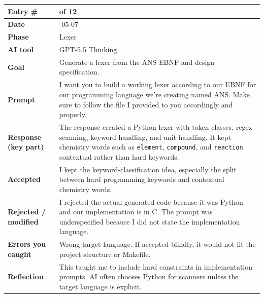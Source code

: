 \documentclass[11pt,a4paper]{article}
\newcommand{\code}[1]{\texttt{#1}}
\newcommand{\entrygap}{\vspace{8pt}}
\newenvironment{journalentry}{%
  \begin{center}\small\renewcommand{\arraystretch}{1.22}%
  \begin{tabular}{|>{\columncolor{anscodebg}\bfseries}p{3.0cm}|>{\RaggedRight\arraybackslash}p{12.25cm}|}%
  \hline
}{%
  \end{tabular}\end{center}\entrygap
}
\begin{document}
\begin{journalentry}
Entry \# & 9 of 12 \\ \hline
Date & 2026-05-07 \\ \hline
Phase & Lexer \\ \hline
AI tool & GPT-5.5 Thinking \\ \hline
Goal & Generate a lexer from the ANS EBNF and design specification. \\ \hline
Prompt & I want you to build a working lexer according to our EBNF for our programming language we're creating named ANS. Make sure to follow the file I provided to you accordingly and properly. \\ \hline
Response (key part) & The response created a Python lexer with token classes, regex scanning, keyword handling, and unit handling. It kept chemistry words such as \code{element}, \code{compound}, and \code{reaction} contextual rather than hard keywords. \\ \hline
Accepted & I kept the keyword-classification idea, especially the split between hard programming keywords and contextual chemistry words. \\ \hline
Rejected / modified & I rejected the actual generated code because it was Python and our implementation is in C. The prompt was underspecified because I did not state the implementation language. \\ \hline
Errors you caught & Wrong target language. If accepted blindly, it would not fit the project structure or Makefile. \\ \hline
Reflection & This taught me to include hard constraints in implementation prompts. AI often chooses Python for scanners unless the target language is explicit. \\ \hline
\end{journalentry}
\end{document}
